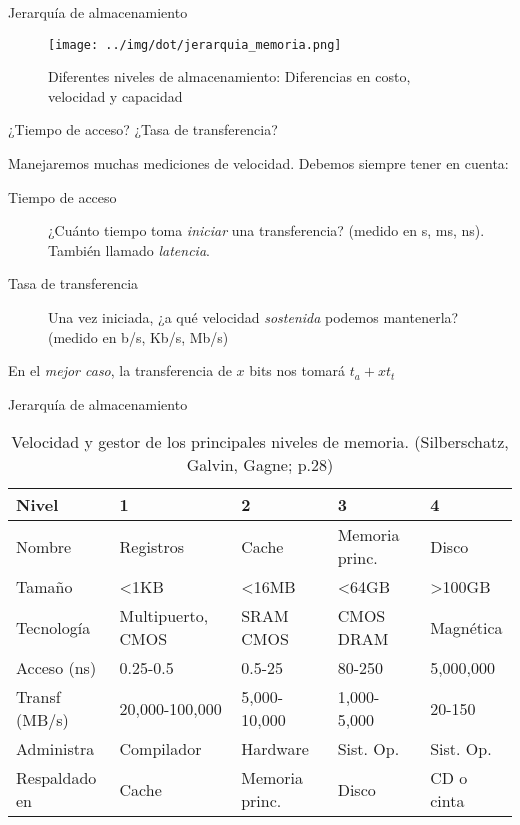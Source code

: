 \documentclass[presentation]{beamer}
\begin{document}
\begin{frame}[label={sec:orgce179d4}]{Jerarquía de almacenamiento}
\begin{figure}[htbp]
\centering
\texttt{[image: ../img/dot/jerarquia\_memoria.png]}
\caption{Diferentes niveles de almacenamiento: Diferencias en costo, velocidad y capacidad}
\end{figure}
\end{frame}
\begin{frame}[label={sec:orga87dd69}]{¿Tiempo de acceso? ¿Tasa de transferencia?}
\begin{center}
Manejaremos muchas mediciones de velocidad. Debemos siempre tener en cuenta:
\end{center}
\begin{description}
\item[{Tiempo de acceso}] ¿Cuánto tiempo toma \emph{iniciar} una
transferencia? (medido en s, ms, ns). También llamado \emph{latencia}.
\item[{Tasa de transferencia}] Una vez iniciada, ¿a qué velocidad
\emph{sostenida} podemos mantenerla? (medido en b/s, Kb/s, Mb/s)
\end{description}
\begin{center}
En el \emph{mejor caso}, la transferencia de \(x\) bits nos tomará \(t_a +
xt_t\)
\end{center}
\end{frame}
\begin{frame}[label={sec:orge16bcdd}]{Jerarquía de almacenamiento}
\begin{center}
{\scriptsize
\begin{table}[htbp]
\caption{Velocidad y gestor de los principales niveles de memoria. (Silberschatz, Galvin, Gagne; p.28)}
\centering
\begin{tabular}{lllll}
Nivel & 1 & 2 & 3 & 4\\
\hline
\alert{Nombre} & Registros & Cache & Memoria princ. & Disco\\
\alert{Tamaño} & <1KB & <16MB & <64GB & >100GB\\
\alert{Tecnología} & Multipuerto, CMOS & SRAM CMOS & CMOS DRAM & Magnética\\
\alert{Acceso (ns)} & 0.25-0.5 & 0.5-25 & 80-250 & 5,000,000\\
\alert{Transf (MB/s)} & 20,000-100,000 & 5,000-10,000 & 1,000-5,000 & 20-150\\
\alert{Administra} & Compilador & Hardware & Sist. Op. & Sist. Op.\\
\alert{Respaldado en} & Cache & Memoria princ. & Disco & CD o cinta\\
\end{tabular}
\end{table}
}
\end{center}
\end{frame}
\end{document}
